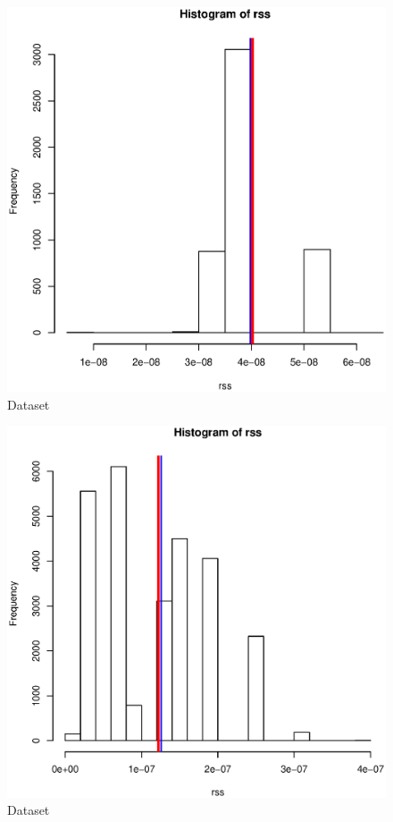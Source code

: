 \documentclass [12 pt , a4paper ] {article}
\begin{document}
\begin{figure}[!ht]
  \centering
  \includegraphics[scale=0.2]{link-14-channel-165.eps}
  \caption{Dataset}
  \label{fig:Dataset}
\end{figure}
\begin{figure}[!ht]
  \centering
  \includegraphics[scale=0.2]{link-35-channel-36.eps}
  \caption{Dataset}
  \label{fig:Dataset}
\end{figure}
\end{document}
